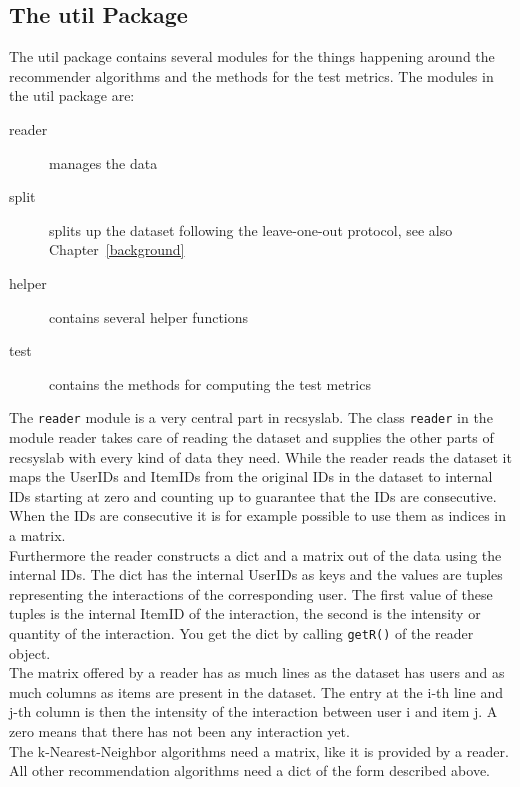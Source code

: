 \subsection*{The util Package}
The util package contains several modules for the things happening around the 
recommender algorithms and the methods for the test metrics.
The modules in the util package are:
\begin{description}
\item[reader] manages the data
\item[split] splits up the dataset following the leave-one-out protocol, see also Chapter~\ref{background}
\item[helper] contains several helper functions
\item[test] contains the methods for computing the test metrics
\end{description}
The \lstinline!reader! module is a very central part in recsyslab.
The class \lstinline!reader! in the module reader takes care of reading the dataset and 
supplies the other parts of recsyslab with every kind of data they need.
While the reader reads the dataset it maps the UserIDs and 
ItemIDs from the original IDs in the dataset to internal IDs 
starting at zero and counting up to guarantee that the IDs are consecutive. 
When the IDs are consecutive it is for example possible to use them as
indices in a matrix. \\
Furthermore the reader constructs a dict and a matrix
out of the data using the internal IDs. The dict has the internal 
UserIDs as keys and the values are tuples representing the 
interactions of the corresponding user. The first value of these tuples is the internal
ItemID of the interaction, the second is the intensity or
quantity of the interaction. You get the dict by calling \lstinline!getR()!
of the reader object. \\
The matrix offered by a reader has as much lines as the dataset
has users and as much columns as items are present in the dataset.
The entry at the i-th line and j-th column is then the intensity of the interaction
between user i and item j. A zero means that there has not been any
interaction yet.\\
The k-Nearest-Neighbor algorithms need a matrix, like it is provided by a
reader. All other recommendation algorithms need a dict of the 
form described above.

